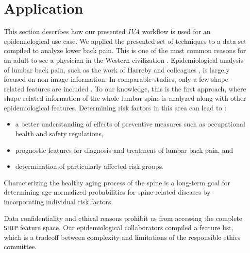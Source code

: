 \documentclass[journal]{style/vgtc} 			          %
\begin{document}
\section{Application}
This section describes how our presented \emph{IVA} workflow is used for an epidemiological use case.
%
We applied the presented set of techniques to a data set compiled to analyze lower back pain. 
%
This is one of the most common reasons for an adult to see a physician in the Western civilization \cite{Backpain}.
%
Epidemiological analysis of lumbar back pain, such as the work of Harreby and colleagues \cite{Harreby1996}, is largely focused on non-image information.
%
In comparable studies, only a few shape-related features are included \cite{Lang2011}.
%
To our knowledge, this is the first approach, where shape-related information of the whole lumbar spine is analyzed along with other epidemiological features.
%
Determining risk factors in this area can lead to \cite{Fletcher2012}:
\begin{itemize}
	\item a better understanding of effects of preventive measures such as occupational health and safety regulations,
	\item prognostic features for diagnosis and treatment of lumbar back pain, and
	\item determination of particularly affected risk groups.
\end{itemize}
%
Characterizing the healthy aging process of the spine is a long-term goal for determining age-normalized probabilities for spine-related diseases by incorporating individual risk factors.

Data confidentiality and ethical reasons prohibit us from accessing the complete \texttt{SHIP} feature space.
%
Our epidemiological collaborators compiled a feature list, which is a tradeoff between complexity and limitations of the responsible ethics committee.
%
%
\end{document}
